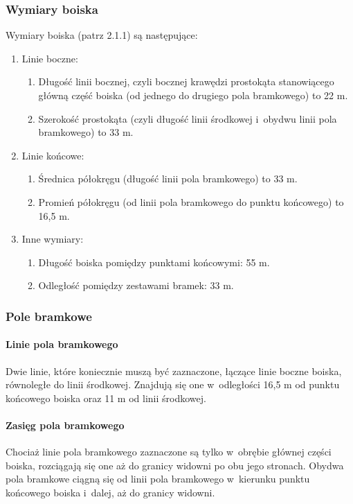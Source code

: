 \documentclass[12pt,a4paper]{article}
\begin{document}
\subsubsection{Wymiary boiska}
Wymiary boiska (patrz 2.1.1) są następujące:
\begin{enumerate}
	\item{Linie boczne:}
	      \begin{enumerate}
		      \item Długość linii bocznej, czyli bocznej krawędzi prostokąta stanowiącego
		            główną część boiska (od jednego do drugiego pola bramkowego) to 22 m.

		      \item Szerokość prostokąta (czyli długość linii środkowej i~obydwu linii
		            pola bramkowego) to 33 m.
	      \end{enumerate}
	\item{Linie końcowe:}
	      \begin{enumerate}
		      \item Średnica półokręgu (długość linii pola bramkowego) to 33 m.

		      \item Promień półokręgu (od linii pola bramkowego do punktu końcowego) to
		            16,5 m.
	      \end{enumerate}
	\item{Inne wymiary:}
	      \begin{enumerate}
		      \item Długość boiska pomiędzy punktami końcowymi: 55 m.

		      \item Odległość pomiędzy zestawami bramek: 33 m.
	      \end{enumerate}
\end{enumerate}

\subsubsection{Pole bramkowe}
\paragraph{Linie pola bramkowego}
Dwie linie, które koniecznie
muszą być zaznaczone, łączące linie boczne boiska, równoległe do linii
środkowej. Znajdują się one w~odległości 16,5 m od punktu końcowego
boiska oraz 11 m od linii środkowej.

\paragraph{Zasięg pola bramkowego}
Chociaż linie pola bramkowego zaznaczone są tylko w~obrębie głównej części boiska, rozciągają się one aż do granicy widowni po obu jego stronach. Obydwa pola bramkowe ciągną się od linii pola bramkowego w~kierunku punktu końcowego boiska i~dalej, aż do granicy widowni.
\end{document}
